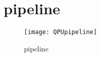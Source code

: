 
\chapter{\qpu{} pipeline} %

\label{AppendixD} %

\begin{figure}[!htbp]
	\centering
	\texttt{[image: QPUpipeline]}
	\caption{\qpu{} pipeline}
\end{figure}
